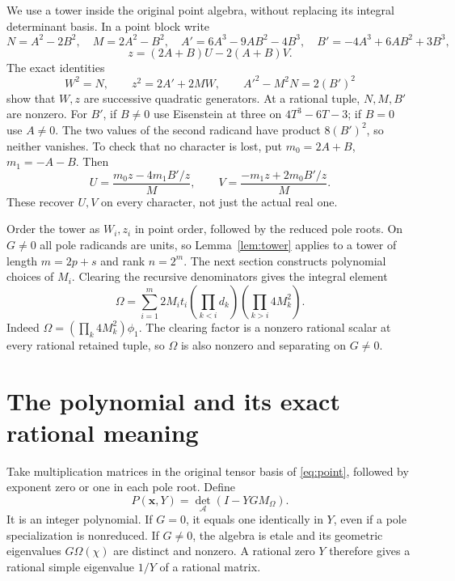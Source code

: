 \documentclass[11pt,a4paper]{article}
\theoremstyle{remark}\newtheorem{remark}[theorem]{Remark}
\begin{document}
We use a tower inside the original point algebra, without replacing its
integral determinant basis. In a point block write
\[
 N=A^2-2B^2,\quad M=2A^2-B^2,\quad
 A'=6A^3-9AB^2-4B^3,\quad B'=-4A^3+6AB^2+3B^3,
\]
\[
                   z=(2A+B)U-2(A+B)V.
\]
The exact identities
\begin{equation}\label{eq:towerpoint}
 W^2=N,\qquad z^2=2A'+2MW,\qquad A'^2-M^2N=2(B')^2
\end{equation}
show that $W,z$ are successive quadratic generators. At a rational tuple,
$N,M,B'$ are nonzero. For $B'$, if $B\ne0$ use Eisenstein at three
on $4T^3-6T-3$; if $B=0$ use $A\ne0$. The two values of the second
radicand have product $8(B')^2$, so neither vanishes. To check that
no character is lost, put $m_0=2A+B$, $m_1=-A-B$. Then
\[
 U=\frac{m_0z-4m_1B'/z}{M},\qquad
 V=\frac{-m_1z+2m_0B'/z}{M}.
\]
These recover $U,V$ on every character, not just the actual real one.

Order the tower as $W_i,z_i$ in point order, followed by the reduced
pole roots. On $G\ne0$ all pole radicands are units, so
Lemma~\ref{lem:tower} applies to a tower of length $m=2p+s$ and rank
$n=2^m$. The next section constructs polynomial choices of $M_i$.
Clearing the recursive denominators gives the integral element
\begin{equation}\label{eq:omega}
 \Omega=\sum_{i=1}^m 2M_it_i
       \left(\prod_{k<i}d_k\right)
       \left(\prod_{k>i}4M_k^2\right).
\end{equation}
Indeed $\Omega=(\prod_k4M_k^2)\phi_1$. The clearing factor is a
nonzero rational scalar at every rational retained tuple, so $\Omega$
is also nonzero and separating on $G\ne0$.

\section{The polynomial and its exact rational meaning}
Take multiplication matrices in the original tensor basis of
\eqref{eq:point}, followed by exponent zero or one in each pole root.
Define
\begin{equation}\label{eq:polynomial}
                    P(\boldsymbol x,Y)=\det_{\mathcal A}(I-YG M_\Omega).
\end{equation}
It is an integer polynomial. If $G=0$, it equals one identically in
$Y$, even if a pole specialization is nonreduced. If $G\ne0$, the
algebra is etale and its geometric eigenvalues $G\Omega(\chi)$ are
distinct and nonzero. A rational zero $Y$ therefore gives a rational
simple eigenvalue $1/Y$ of a rational matrix.
\end{document}
